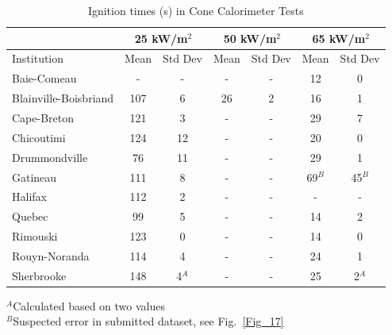 \documentclass{book}
\begin{document}
\begin{table}[ht]
\caption{Ignition times (s) in Cone Calorimeter Tests}
\label{Table_12}
\begin{center}
\begin{tabular}{|l|cc|cc|cc|}
\hline
                         & \multicolumn{2}{|c|}{25 kW/m$^2$} &  \multicolumn{2}{|c|}{50 kW/m$^2$} & \multicolumn{2}{|c|}{65 kW/m$^2$}    \\ \hline
Institution              & Mean     & Std Dev                & Mean      & Std Dev                & Mean     & Std Dev                   \\ \hline
Baie-Comeau              & -        & -                      & -         & -                      & 12       & 0                         \\
Blainville-Boisbriand    & 107      & 6                      & 26        & 2                      & 16       & 1                         \\
Cape-Breton              & 121      & 3                      & -         & -                      & 29       & 7                         \\
Chicoutimi               & 124      & 12                     & -         & -                      & 20       & 0                         \\
Drummondville            & 76       & 11                     & -         & -                      & 29       & 1                         \\
Gatineau                 & 111      & 8                      & -         & -                      & 69$^B$   & 45$^B$                    \\
Halifax                  & 112      & 2                      & -         & -                      & -        & -                         \\
Quebec                   & 99       & 5                      & -         & -                      & 14       & 2                         \\
Rimouski                 & 123      & 0                      & -         & -                      & 14       & 0                         \\
Rouyn-Noranda            & 114      & 4                      & -         & -                      & 24       & 1                         \\
Sherbrooke               & 148      & 4$^A$                  & -         & -                      & 25       & 2$^A$                     \\ \hline
\end{tabular}
\end{center}
$^A$Calculated based on two values     \\
$^B$Suspected error in submitted dataset, see Fig.~\ref{Fig_17}
\end{table}
\end{document}
